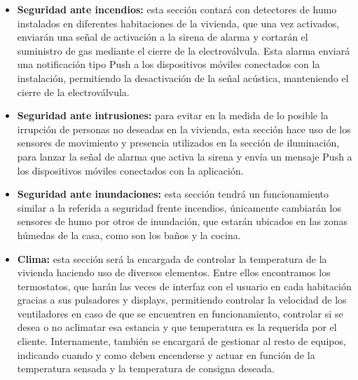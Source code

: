 \begin{itemize}
\item \textbf{Seguridad ante incendios: }esta sección contará con detectores de humo instalados en diferentes habitaciones de la vivienda, que una vez activados, enviarán una señal de activación a la sirena de alarma y cortarán el suministro de gas mediante el cierre de la electroválvula. Esta alarma enviará una notificación tipo Push a los dispositivos móviles conectados con la instalación, permitiendo la desactivación de la señal acústica, manteniendo el cierre de la electroválvula.\\
\item \textbf{Seguridad ante intrusiones: }para evitar en la medida de lo posible la irrupción de personas no deseadas en la vivienda, esta sección hace uso de los sensores de movimiento y presencia utilizados en la sección de iluminación, para lanzar la señal de alarma que activa la sirena y envía un mensaje Push a los dispositivos móviles conectados con la aplicación.\\
\item \textbf{Seguridad ante inundaciones: }esta sección tendrá un funcionamiento similar a la referida a seguridad frente incendios, únicamente cambiarán los sensores de humo por otros de inundación, que estarán ubicados en las zonas húmedas de la casa, como son los baños y la cocina.\\
\item \textbf{Clima:} esta sección será la encargada de controlar la temperatura de la vivienda haciendo uso de diversos elementos. Entre ellos encontramos los termostatos, que harán las veces de interfaz con el usuario en cada habitación gracias a sus pulsadores y displays, permitiendo controlar la velocidad de los ventiladores en caso de que se encuentren en funcionamiento, controlar si se desea o no aclimatar esa estancia y que temperatura es la requerida por el cliente. Internamente, también se encargará de gestionar al resto de equipos, indicando cuando y como deben encenderse y actuar en función de la temperatura sensada y la temperatura de consigna deseada. \\

\end{itemize}
